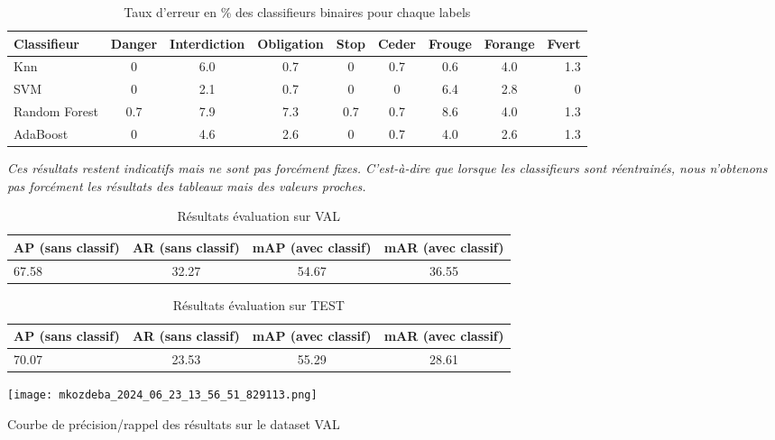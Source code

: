 \documentclass[a4paper,11pt]{article}
\begin{document}
\begin{table}[H]
\centering
\small %
\setlength{\tabcolsep}{3pt} %
\begin{tabular}{@{}lcccccccr@{}}
\toprule
\textbf{Classifieur} & \textbf{Danger} & \textbf{Interdiction} & \textbf{Obligation} & \textbf{Stop} & \textbf{Ceder} & \textbf{Frouge} & \textbf{Forange} & \textbf{Fvert} \\
\midrule
Knn & 0 & 6.0 & 0.7 & 0 & 0.7 & 0.6 & 4.0 & 1.3 \\
SVM & 0 & 2.1 & 0.7 & 0 & 0 & 6.4 & 2.8 & 0 \\
Random Forest & 0.7 & 7.9 & 7.3 & 0.7 & 0.7 & 8.6 & 4.0 & 1.3 \\
AdaBoost & 0 & 4.6 & 2.6 & 0 & 0.7 & 4.0 & 2.6 & 1.3 \\
\bottomrule
\end{tabular}
\caption{Taux d'erreur en \% des classifieurs binaires pour chaque labels}
\label{tab:classification-results}
\end{table}
\textit {Ces résultats restent indicatifs mais ne sont pas forcément fixes. C'est-à-dire que lorsque les classifieurs sont réentrainés, nous n'obtenons pas forcément les résultats des tableaux mais des valeurs proches.}


\begin{table}[H]
\centering
\begin{tabular}{lccc}
\toprule
\textbf{AP (sans classif)} & \textbf{AR (sans classif)} & \textbf{mAP (avec classif)} & \textbf{mAR (avec classif)} \\
\midrule
67.58 & 32.27 & 54.67 & 36.55 \\
\bottomrule
\end{tabular}
\caption{Résultats évaluation sur VAL}
\end{table}

\begin{table}[H]
\centering
\begin{tabular}{lccc}
\toprule
\textbf{AP (sans classif)} & \textbf{AR (sans classif)} & \textbf{mAP (avec classif)} & \textbf{mAR (avec classif)} \\
\midrule
70.07 & 23.53 & 55.29 & 28.61 \\
\bottomrule
\end{tabular}
\caption{Résultats évaluation sur TEST}
\end{table}

\begin{table}[H]
    \centering
    \texttt{[image: mkozdeba\_2024\_06\_23\_13\_56\_51\_829113.png]}
    \caption{Courbe de précision/rappel des résultats sur le dataset VAL}
    \label{fig:enter-label}
\end{table}
\end{document}
